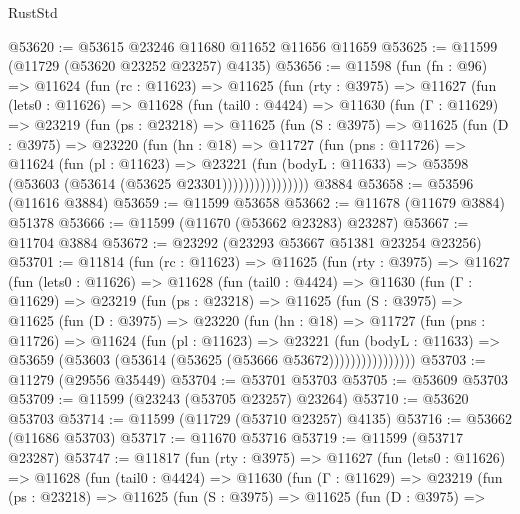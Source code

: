 \begin{lexlean}{RustStd}
\begin{coremodule}
@53620 := @53615 @23246 @11680 @11652 @11656 @11659
@53625 := @11599 (@11729 (@53620 @23252 @23257) @4135)
@53656 := @11598
    (fun (fn : @96) =>
    @11624
      (fun (rc : @11623) =>
      @11625
        (fun (rty : @3975) =>
        @11627
          (fun (lets0 : @11626) =>
          @11628
            (fun (tail0 : @4424) =>
            @11630
              (fun (Γ : @11629) =>
              @23219
                (fun (ps : @23218) =>
                @11625
                  (fun (S : @3975) =>
                  @11625
                    (fun (D : @3975) =>
                    @23220
                      (fun (hn : @18) =>
                      @11727
                        (fun (pns : @11726) =>
                        @11624
                          (fun (pl : @11623) =>
                          @23221
                            (fun (bodyL : @11633) =>
                            @53598 (@53603 (@53614 (@53625 @23301))))))))))))))))
    @3884
@53658 := @53596 (@11616 @3884)
@53659 := @11599 @53658
@53662 := @11678 (@11679 @3884) @51378
@53666 := @11599 (@11670 (@53662 @23283) @23287)
@53667 := @11704 @3884
@53672 := @23292 (@23293 @53667 @51381 @23254 @23256)
@53701 := @11814
    (fun (rc : @11623) =>
    @11625
      (fun (rty : @3975) =>
      @11627
        (fun (lets0 : @11626) =>
        @11628
          (fun (tail0 : @4424) =>
          @11630
            (fun (Γ : @11629) =>
            @23219
              (fun (ps : @23218) =>
              @11625
                (fun (S : @3975) =>
                @11625
                  (fun (D : @3975) =>
                  @23220
                    (fun (hn : @18) =>
                    @11727
                      (fun (pns : @11726) =>
                      @11624
                        (fun (pl : @11623) =>
                        @23221
                          (fun (bodyL : @11633) =>
                          @53659 (@53603 (@53614 (@53625 (@53666 @53672))))))))))))))))
@53703 := @11279 (@29556 @35449)
@53704 := @53701 @53703
@53705 := @53609 @53703
@53709 := @11599 (@23243 (@53705 @23257) @23264)
@53710 := @53620 @53703
@53714 := @11599 (@11729 (@53710 @23257) @4135)
@53716 := @53662 (@11686 @53703)
@53717 := @11670 @53716
@53719 := @11599 (@53717 @23287)
@53747 := @11817
    (fun (rty : @3975) =>
    @11627
      (fun (lets0 : @11626) =>
      @11628
        (fun (tail0 : @4424) =>
        @11630
          (fun (Γ : @11629) =>
          @23219
            (fun (ps : @23218) =>
            @11625
              (fun (S : @3975) =>
              @11625
                (fun (D : @3975) =>

\end{coremodule}
\end{lexlean}
